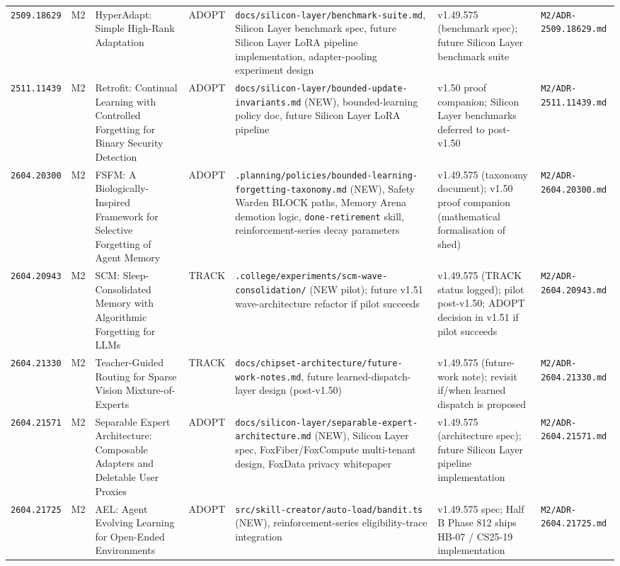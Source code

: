 \documentclass[11pt,letterpaper]{article}
\newcommand{\arxivid}[1]{\texttt{\textcolor{accent}{#1}}}
\begin{document}
\begin{footnotesize}
\begin{longtable}{@{}L{0.10\textwidth} L{0.025\textwidth} L{0.22\textwidth} L{0.06\textwidth} L{0.20\textwidth} L{0.13\textwidth} L{0.13\textwidth}@{}}
\arxivid{2509.18629} & M2 & HyperAdapt: Simple High-Rank Adaptation & ADOPT & \texttt{docs/silicon-layer/benchmark-suite.md}, Silicon Layer benchmark spec, future Silicon Layer LoRA pipeline implementation, adapter-pooling experiment design & v1.49.575 (benchmark spec); future Silicon Layer benchmark suite & \texttt{\small M2/ADR-2509.18629.md} \\
\arxivid{2511.11439} & M2 & Retrofit: Continual Learning with Controlled Forgetting for Binary Security Detection & ADOPT & \texttt{docs/silicon-layer/bounded-update-invariants.md} (NEW), bounded-learning policy doc, future Silicon Layer LoRA pipeline & v1.50 proof companion; Silicon Layer benchmarks deferred to post-v1.50 & \texttt{\small M2/ADR-2511.11439.md} \\
\arxivid{2604.20300} & M2 & FSFM: A Biologically-Inspired Framework for Selective Forgetting of Agent Memory & ADOPT & \texttt{.planning/policies/bounded-learning-forgetting-taxonomy.md} (NEW), Safety Warden BLOCK paths, Memory Arena demotion logic, \texttt{done-retirement} skill, reinforcement-series decay parameters & v1.49.575 (taxonomy document); v1.50 proof companion (mathematical formalisation of shed) & \texttt{\small M2/ADR-2604.20300.md} \\
\arxivid{2604.20943} & M2 & SCM: Sleep-Consolidated Memory with Algorithmic Forgetting for LLMs & TRACK & \texttt{.college/experiments/scm-wave-consolidation/} (NEW pilot); future v1.51 wave-architecture refactor if pilot succeeds & v1.49.575 (TRACK status logged); pilot post-v1.50; ADOPT decision in v1.51 if pilot succeeds & \texttt{\small M2/ADR-2604.20943.md} \\
\arxivid{2604.21330} & M2 & Teacher-Guided Routing for Sparse Vision Mixture-of-Experts & TRACK & \texttt{docs/chipset-architecture/future-work-notes.md}, future learned-dispatch-layer design (post-v1.50) & v1.49.575 (future-work note); revisit if/when learned dispatch is proposed & \texttt{\small M2/ADR-2604.21330.md} \\
\arxivid{2604.21571} & M2 & Separable Expert Architecture: Composable Adapters and Deletable User Proxies & ADOPT & \texttt{docs/silicon-layer/separable-expert-architecture.md} (NEW), Silicon Layer spec, FoxFiber/FoxCompute multi-tenant design, FoxData privacy whitepaper & v1.49.575 (architecture spec); future Silicon Layer pipeline implementation & \texttt{\small M2/ADR-2604.21571.md} \\
\arxivid{2604.21725} & M2 & AEL: Agent Evolving Learning for Open-Ended Environments & ADOPT & \texttt{src/skill-creator/auto-load/bandit.ts} (NEW), reinforcement-series eligibility-trace integration & v1.49.575 spec; Half B Phase 812 ships HB-07 / CS25-19 implementation & \texttt{\small M2/ADR-2604.21725.md} \\

\end{longtable}
\end{footnotesize}
\end{document}
